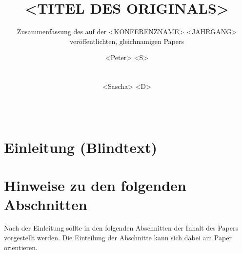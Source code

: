 \documentclass[ngerman]{ewks-latex}
\begin{document}
\title{<TITEL DES ORIGINALS>}

\subtitle{Zusammenfassung des auf der <KONFERENZNAME> <JAHRGANG> veröffentlichten, gleichnamigen Papers}

\author{
	\alignauthor
	<Peter> <S>\\
	\\
    \\
	\alignauthor
	<Sascha> <D>\\
	\\
    \\
}

\maketitle

\section{Einleitung (Blindtext)}
\lipsum[1-4]

\section{Hinweise zu den folgenden Abschnitten}
Nach der Einleitung sollte in den folgenden Abschnitten der Inhalt des Papers vorgestellt werden. Die Einteilung der Abschnitte kann sich dabei am Paper orientieren.
\end{document}
